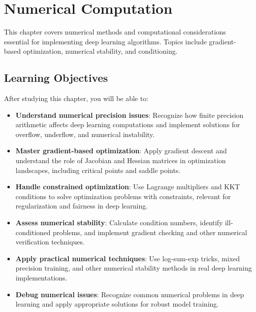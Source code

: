 
\chapter{Numerical Computation}
\label{chap:numerical-computation}

This chapter covers numerical methods and computational considerations essential for implementing deep learning algorithms. Topics include gradient-based optimization, numerical stability, and conditioning.

\section*{Learning Objectives}

After studying this chapter, you will be able to:

\begin{itemize}
    \item \textbf{Understand numerical precision issues}: Recognize how finite precision arithmetic affects deep learning computations and implement solutions for overflow, underflow, and numerical instability.
    
    \item \textbf{Master gradient-based optimization}: Apply gradient descent and understand the role of Jacobian and Hessian matrices in optimization landscapes, including critical points and saddle points.
    
    \item \textbf{Handle constrained optimization}: Use Lagrange multipliers and KKT conditions to solve optimization problems with constraints, relevant for regularization and fairness in deep learning.
    
    \item \textbf{Assess numerical stability}: Calculate condition numbers, identify ill-conditioned problems, and implement gradient checking and other numerical verification techniques.
    
    \item \textbf{Apply practical numerical techniques}: Use log-sum-exp tricks, mixed precision training, and other numerical stability methods in real deep learning implementations.
    
    \item \textbf{Debug numerical issues}: Recognize common numerical problems in deep learning and apply appropriate solutions for robust model training.
\end{itemize}

